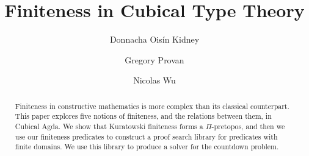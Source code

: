 

\title{Finiteness in Cubical Type Theory}

\author{
  Donnacha Oisín Kidney
  \and
  Gregory Provan
  \and
  Nicolas Wu
}

\begin{abstract}
  Finiteness in constructive mathematics is more complex than its classical
  counterpart.
  This paper explores five notions of finiteness, and the relations between
  them, in Cubical Agda.
  We show that Kuratowski finiteness forms a $\Pi$-pretopos, and then we
  use our finiteness predicates to construct a proof search library for
  predicates with finite domains.
  We use this library to produce a solver for the countdown problem.
\end{abstract}

\maketitle










 
